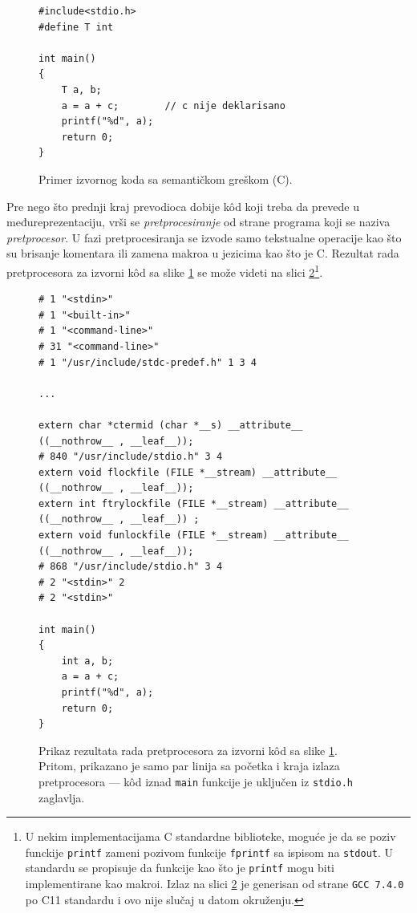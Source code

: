 \begin{figure}[h!]
\begin{lstlisting}
#include<stdio.h>
#define T int

int main()
{
    T a, b;
    a = a + c;        // c nije deklarisano
    printf("%d", a);
    return 0;
}
\end{lstlisting}
\caption{Primer izvornog koda sa semantičkom greškom (C).}
\label{fig:CompilationProcessInit}
\end{figure}

Pre nego što prednji kraj prevodioca dobije k\^od koji treba da prevede u međureprezentaciju, vrši se \emph{pretprocesiranje} od strane programa koji se naziva \emph{pretprocesor}. U fazi pretprocesiranja se izvode samo tekstualne operacije kao što su brisanje komentara ili zamena makroa u jezicima kao što je C. Rezultat rada pretprocesora za izvorni k\^od sa slike \ref{fig:CompilationProcessInit} se može videti na slici \ref{fig:CompilationProcessPrep}\footnote{U nekim implementacijama C standardne biblioteke, moguće je da se poziv funckije \texttt{printf} zameni pozivom funkcije \texttt{fprintf} sa ispisom na \texttt{stdout}. U standardu se propisuje da funkcije kao što je \texttt{printf} mogu biti implementirane kao makroi. Izlaz na slici \ref{fig:CompilationProcessPrep} je generisan od strane \texttt{GCC 7.4.0} po C11 standardu i ovo nije slučaj u datom okruženju.}.

\begin{figure}[h!]
\begin{lstlisting}
# 1 "<stdin>"
# 1 "<built-in>"
# 1 "<command-line>"
# 31 "<command-line>"
# 1 "/usr/include/stdc-predef.h" 1 3 4

...

extern char *ctermid (char *__s) __attribute__ ((__nothrow__ , __leaf__));
# 840 "/usr/include/stdio.h" 3 4
extern void flockfile (FILE *__stream) __attribute__ ((__nothrow__ , __leaf__));
extern int ftrylockfile (FILE *__stream) __attribute__ ((__nothrow__ , __leaf__)) ;
extern void funlockfile (FILE *__stream) __attribute__ ((__nothrow__ , __leaf__));
# 868 "/usr/include/stdio.h" 3 4
# 2 "<stdin>" 2
# 2 "<stdin>"

int main()
{
    int a, b;
    a = a + c;
    printf("%d", a);
    return 0;
}
\end{lstlisting}
\caption{Prikaz rezultata rada pretprocesora za izvorni k\^od sa slike \ref{fig:CompilationProcessInit}. Pritom, prikazano je samo par linija sa početka i kraja izlaza pretprocesora --- k\^od iznad \texttt{main} funkcije je uključen iz \texttt{stdio.h} zaglavlja.}
\label{fig:CompilationProcessPrep}
\end{figure}

